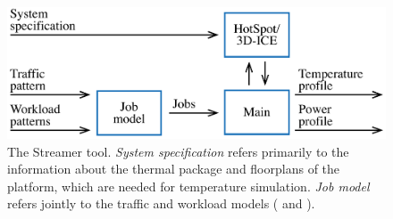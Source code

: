 \begin{figure}
  \centering
  \includegraphics[width=1.0\columnwidth]{include/assets/figures/streamer.pdf}
  \caption{
    The Streamer tool. \emph{System specification} refers primarily to the
    information about the thermal package and floorplans of the platform, which
    are needed for temperature simulation. \emph{Job model} refers jointly to
    the traffic and workload models ( and ).
  }
\end{figure}
